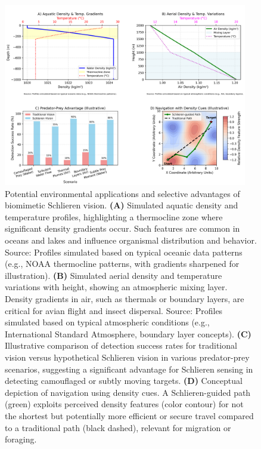 \documentclass[11pt]{article}
\begin{document}
\begin{figure}[htbp]
    \centering
    \includegraphics[width=0.95\textwidth]{figures/figure4_environmental_applications.png} %
    \caption{Potential environmental applications and selective advantages of biomimetic Schlieren vision.
    \textbf{(A)} Simulated aquatic density and temperature profiles, highlighting a thermocline zone where significant density gradients occur. Such features are common in oceans and lakes and influence organismal distribution and behavior. Source: Profiles simulated based on typical oceanic data patterns (e.g., NOAA thermocline patterns, with gradients sharpened for illustration).
    \textbf{(B)} Simulated aerial density and temperature variations with height, showing an atmospheric mixing layer. Density gradients in air, such as thermals or boundary layers, are critical for avian flight and insect dispersal. Source: Profiles simulated based on typical atmospheric conditions (e.g., International Standard Atmosphere, boundary layer concepts).
    \textbf{(C)} Illustrative comparison of detection success rates for traditional vision versus hypothetical Schlieren vision in various predator-prey scenarios, suggesting a significant advantage for Schlieren sensing in detecting camouflaged or subtly moving targets.
    \textbf{(D)} Conceptual depiction of navigation using density cues. A Schlieren-guided path (green) exploits perceived density features (color contour) for not the shortest but potentially more efficient or secure travel compared to a traditional path (black dashed), relevant for migration or foraging.}
    \label{fig:environmental_applications}
\end{figure}
\end{document}
